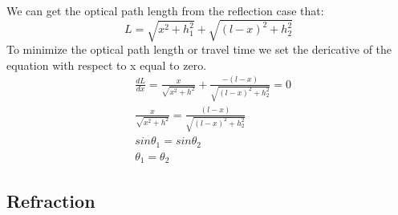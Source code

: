 \documentclass[../main.tex]{subfiles}
\begin{document}
	We can get the optical path length from the reflection case that:
	\begin{equation}
		L = \sqrt{x^2+h_1^2}+\sqrt{(l-x)^2+h_2^2}
	\end{equation}
	To minimize the optical path length or travel time we set the dericative of the equation with respect to x equal to zero.
	\begin{align}
		&\frac{dL}{dx}=\frac{x}{\sqrt{x^2+h^2}}+\frac{-(l-x)}{\sqrt{(l-x)^2+h_2^2}}=0\\
		&\frac{x}{\sqrt{x^2+h^2}}=\frac{(l-x)}{\sqrt{(l-x)^2+h_2^2}}\\
		&sin\theta_1=sin\theta_2\\
		&\theta_1=\theta_2
	\end{align}

	\subsection{Refraction}
\end{document}

